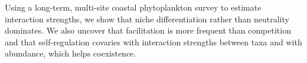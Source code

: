 \documentclass[english]{article}
\begin{document}
Using a long-term, multi-site coastal phytoplankton survey to estimate interaction strengths, we show that niche differentiation rather than neutrality dominates. We also uncover that facilitation is more frequent than competition and that self-regulation covaries with interaction strengths between taxa and with abundance, which helps coexistence.
\end{document}
